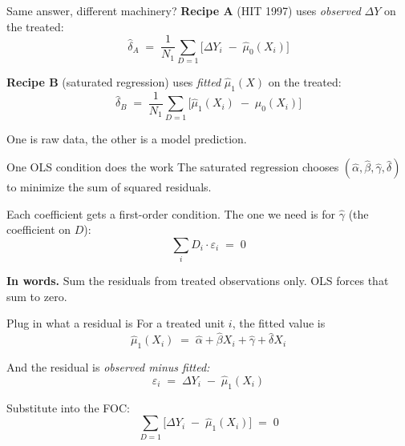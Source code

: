 \documentclass[aspectratio=169,11pt]{beamer}
\begin{document}
\begin{frame}{Same answer, different machinery?}
\footnotesize
\textbf{Recipe A} (HIT 1997) uses \textit{observed} $\Delta Y$ on the treated:
\[
\widehat\delta_A \;=\; \frac{1}{N_1}\sum_{D=1} \Big[\Delta Y_i \;-\; \widehat\mu_0(X_i)\Big]
\]

\vspace{0.4em}
\textbf{Recipe B} (saturated regression) uses \textit{fitted} $\widehat\mu_1(X)$ on the treated:
\[
\widehat\delta_B \;=\; \frac{1}{N_1}\sum_{D=1} \Big[\widehat\mu_1(X_i) \;-\; \widehat\mu_0(X_i)\Big]
\]

\vspace{0.6em}
 \;One is raw data, the other is a model prediction.

\vspace{0.4em}
\end{frame}

\begin{frame}{One OLS condition does the work}
\footnotesize
The saturated regression chooses $(\widehat\alpha, \widehat\beta, \widehat\gamma, \widehat\delta)$ to minimize the sum of squared residuals.

\vspace{0.5em}
Each coefficient gets a first-order condition. \;The one we need is for $\widehat\gamma$ (the coefficient on $D$):
\vspace{0.2em}
\[
\sum_i D_i \cdot \varepsilon_i \;=\; 0
\]

\vspace{0.5em}
\textbf{In words.} \;Sum the residuals from treated observations only. \;OLS forces that sum to zero.

\vspace{0.5em}
\end{frame}

\begin{frame}{Plug in what a residual is}
\footnotesize
For a treated unit $i$, the fitted value is
\[
\widehat\mu_1(X_i) \;=\; \widehat\alpha + \widehat\beta X_i + \widehat\gamma + \widehat\delta X_i
\]

\vspace{0.4em}
And the residual is \textit{observed minus fitted:}
\[
\varepsilon_i \;=\; \Delta Y_i \;-\; \widehat\mu_1(X_i)
\]

\vspace{0.5em}
Substitute into the FOC:
\[
\sum_{D=1} \Big[\Delta Y_i \;-\; \widehat\mu_1(X_i)\Big] \;=\; 0
\]
\end{frame}
\end{document}
